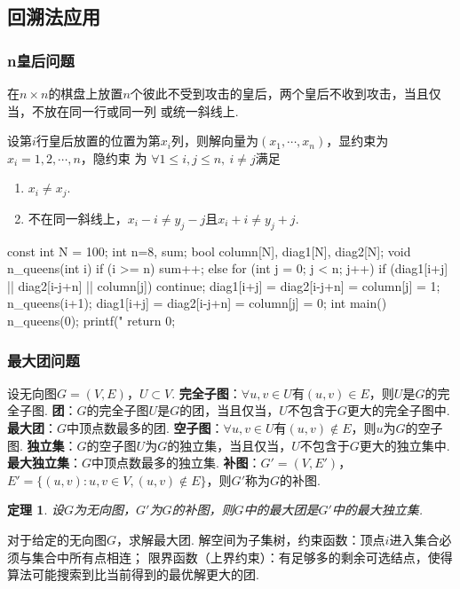 \documentclass[12pt, a4paper, oneside]{ctexart}
\newtheorem{theorem}{定理}[section] %
\numberwithin{equation}{section}  %
\theoremstyle{definition}
\let\leq=\leqslant %
\def\del{\vspace{-1.5ex}}   %
\begin{document}
\subsection{回溯法应用}
\del
\subsubsection{n皇后问题}
在$n\times n$的棋盘上放置$n$个彼此不受到攻击的皇后，两个皇后不收到攻击，当且仅当，不放在同一行或同一列
或统一斜线上.

设第$i$行皇后放置的位置为第$x_i$列，则解向量为$(x_1,\cdots, x_n)$，显约束为$x_i=1,2,\cdots, n$，隐约束
为 $\forall 1\leq i, j\leq n,\ i\neq j$满足
\begin{enumerate}
    \item $x_i\neq x_j$.
    \item 不在同一斜线上，$x_i-i\neq y_j-j$且$x_i+i\neq y_j+j$.
\end{enumerate}
\begin{cppcode}
const int N = 100;
int n=8, sum;
bool column[N], diag1[N], diag2[N];
void n_queens(int i) {
    if (i >= n) sum++;
    else {
        for (int j = 0; j < n; j++) {
            if (diag1[i+j] || diag2[i-j+n] || column[j])
                continue;
            diag1[i+j] = diag2[i-j+n] = column[j] = 1;
            n_queens(i+1);
            diag1[i+j] = diag2[i-j+n] = column[j] = 0;
        }
    }
}
int main() {
    n_queens(0);
    printf("%
    return 0;
}
\end{cppcode}
\subsubsection{最大团问题}
设无向图$G = (V,E)$，$U\subset V$.
\textbf{完全子图}：$\forall u, v \in U$有$(u,v)\in E$，则$U$是$G$的完全子图.
\textbf{团}：$G$的完全子图$U$是$G$的团，当且仅当，$U$不包含于$G$更大的完全子图中.
\textbf{最大团}：$G$中顶点数最多的团.
\textbf{空子图}：$\forall u,v\in U$有$(u,v)\notin E$，则$u$为$G$的空子图.
\textbf{独立集}：$G$的空子图$U$为$G$的独立集，当且仅当，$U$不包含于$G$更大的独立集中.
\textbf{最大独立集}：$G$中顶点数最多的独立集.
\textbf{补图}：$G' = (V,E')$，$E' = \{(u,v):u,v\in V, (u,v)\notin E\}$，则$G'$称为$G$的补图.
\begin{theorem}
    设$G$为无向图，$G'$为$G$的补图，则$G$中的最大团是$G'$中的最大独立集.
\end{theorem}

对于给定的无向图$G$，求解最大团. 解空间为子集树，约束函数：顶点$i$进入集合必须与集合中所有点相连；
限界函数（上界约束）：有足够多的剩余可选结点，使得算法可能搜索到比当前得到的最优解更大的团.
\end{document}
